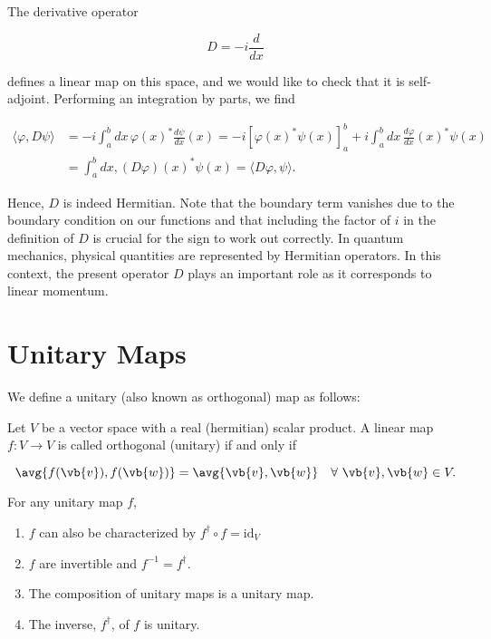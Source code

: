 \documentclass[a4paper,12pt]{report}
\begin{document}
The derivative operator

\begin{equation}
D = -i \frac{d}{dx}
\end{equation}

defines a linear map on this space, and we would like to check that it is self-adjoint. Performing an integration by parts, we find

\begin{equation}
\begin{aligned}
\langle \varphi, D\psi \rangle &= -i \int_a^b dx \, \varphi(x)^* \frac{d\psi}{dx}(x) = -i \left[ \varphi(x)^* \psi(x) \right]_{a}^{b} + i \int_a^b dx \, \frac{d\varphi}{dx}(x)^* \psi(x) \\ &= \int_a^b dx , (D\varphi)(x)^* \psi(x) = \langle D\varphi, \psi \rangle.
\end{aligned}
\end{equation}

Hence, $D$ is indeed Hermitian. Note that the boundary term vanishes due to the boundary condition on our functions and that including the factor of $i$ in the definition of $D$ is crucial for the sign to work out correctly. In quantum mechanics, physical quantities are represented by Hermitian operators. In this context, the present operator $D$ plays an important role as it corresponds to linear momentum.

\section{Unitary Maps}

We define a unitary (also known as orthogonal) map as follows:

\begin{definition}
Let \(V\) be a vector space with a real (hermitian) scalar product. A linear map \(f: V \rightarrow V\) is called orthogonal (unitary) if and only if 
\end{definition}

\begin{equation} \label{unitarydef} 
    \avg{f(\vb{v} ), f(\vb{w} )} = \avg{\vb{v} ,\vb{w} } ~~~\forall ~ \vb{v} ,\vb{w} \in V. 
\end{equation}

\begin{lemma}
For any unitary map \(f\),
\begin{enumerate}[label=(N\arabic*)]
    \item  \(f\) can also be characterized by \(f^{\dagger} \circ f = \mathrm{id}_{V} \) 
    \item  \(f\) are invertible and \(f^{-1} = f^{\dagger} \). 
    \item The composition of unitary maps is a unitary map.
    \item The inverse, \(f^{\dagger} \), of \(f\) is unitary.  
\end{enumerate}

\end{lemma}
\end{document}
